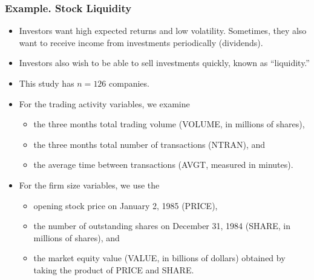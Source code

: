 \begin{frame}[shrink=2]
 \frametitle{Example. Stock Liquidity}
 \begin{itemize}
   \item Investors want high expected returns and low volatility.
   Sometimes, they also want to receive income from investments
   periodically (dividends).
   \item Investors also wish to be able to sell investments quickly,
   known as ``liquidity.''
  \item This study has $n=126$ companies.
  \item For the trading activity variables, we examine
\begin{itemize}
\item the three months total trading volume (VOLUME, in millions of shares),
\item the three months total number of transactions (NTRAN), and
\item the average time between transactions (AVGT, measured in minutes).
\end{itemize}
\item  For the firm size variables, we use the
\begin{itemize}
\item opening stock price on January 2, 1985 (PRICE),
\item  the number of outstanding shares on December 31, 1984 (SHARE, in millions of shares), and
\item  the market equity value (VALUE, in billions of dollars) obtained by taking the product of PRICE and SHARE.
\end{itemize}
    \end{itemize}
\end{frame}

